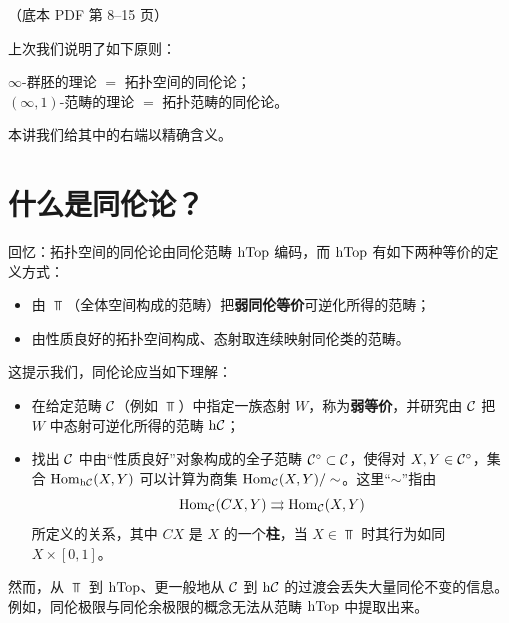 \begin{center}\small\color{black!55}（底本 PDF 第 8–15 页）\end{center}

上次我们说明了如下原则：
\begin{center}
$\infty$-群胚的理论 $=$ 拓扑空间的同伦论；\\
$(\infty,1)$-范畴的理论 $=$ 拓扑范畴的同伦论。
\end{center}
本讲我们给其中的右端以精确含义。

\section{什么是同伦论？}

\nitem\label{L2-1.1} 回忆：拓扑空间的同伦论由同伦范畴 $\operatorname{hTop}$ 编码，而 $\operatorname{hTop}$ 有如下两种等价的定义方式：
\begin{itemize}[leftmargin=2.2em,itemsep=0.1em]
\item 由 $\Top$（全体空间构成的范畴）把\textbf{弱同伦等价}可逆化所得的范畴；
\item 由性质良好的拓扑空间构成、态射取连续映射同伦类的范畴。
\end{itemize}

\nitem\label{L2-1.2} 这提示我们，同伦论应当如下理解：
\begin{itemize}[leftmargin=2.2em,itemsep=0.1em]
\item 在给定范畴 $\mathcal{C}$（例如 $\Top$）中指定一族态射 $W$，称为\textbf{弱等价}，并研究由 $\mathcal{C}$ 把 $W$ 中态射可逆化所得的范畴 $\mathrm{h}\mathcal{C}$；
\item 找出 $\mathcal{C}$ 中由“性质良好”对象构成的全子范畴 $\mathcal{C}^{\circ}\subset\mathcal{C}$，使得对 $X,Y\in\mathcal{C}^{\circ}$，集合 $\operatorname{Hom}_{\mathrm{h}\mathcal{C}}(X,Y)$ 可以计算为商集 $\operatorname{Hom}_{\mathcal{C}}(X,Y)/\sim$。这里“$\sim$”指由
\begin{equation}\label{L2-eq1.1}
\operatorname{Hom}_{\mathcal{C}}(CX,Y)\rightrightarrows\operatorname{Hom}_{\mathcal{C}}(X,Y)
\end{equation}
所定义的关系，其中 $CX$ 是 $X$ 的一个\textbf{柱}，当 $X\in\Top$ 时其行为如同 $X\times[0,1]$。
\end{itemize}

\nitem\label{L2-1.3} 然而，从 $\Top$ 到 $\operatorname{hTop}$、更一般地从 $\mathcal{C}$ 到 $\mathrm{h}\mathcal{C}$ 的过渡会丢失大量同伦不变的信息。例如，同伦极限与同伦余极限的概念无法从范畴 $\operatorname{hTop}$ 中提取出来。

